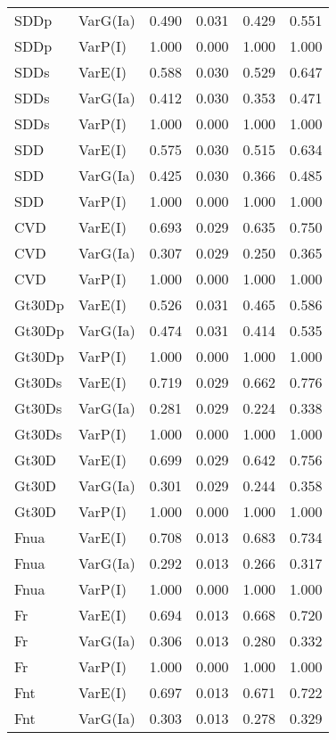\begin{center}
\begin{longtable}{|p{0.6in}|p{0.7in}|p{0.6in}|p{0.6in}|p{0.6in}|p{0.6in}|}
  SDDp & VarG(Ia) & 0.490 & 0.031 & 0.429 & 0.551 \\ 
  SDDp & VarP(I) & 1.000 & 0.000 & 1.000 & 1.000 \\ 
  SDDs & VarE(I) & 0.588 & 0.030 & 0.529 & 0.647 \\ 
  SDDs & VarG(Ia) & 0.412 & 0.030 & 0.353 & 0.471 \\ 
  SDDs & VarP(I) & 1.000 & 0.000 & 1.000 & 1.000 \\ 
  SDD & VarE(I) & 0.575 & 0.030 & 0.515 & 0.634 \\ 
  SDD & VarG(Ia) & 0.425 & 0.030 & 0.366 & 0.485 \\ 
  SDD & VarP(I) & 1.000 & 0.000 & 1.000 & 1.000 \\ 
  CVD & VarE(I) & 0.693 & 0.029 & 0.635 & 0.750 \\ 
  CVD & VarG(Ia) & 0.307 & 0.029 & 0.250 & 0.365 \\ 
  CVD & VarP(I) & 1.000 & 0.000 & 1.000 & 1.000 \\ 
  Gt30Dp & VarE(I) & 0.526 & 0.031 & 0.465 & 0.586 \\ 
  Gt30Dp & VarG(Ia) & 0.474 & 0.031 & 0.414 & 0.535 \\ 
  Gt30Dp & VarP(I) & 1.000 & 0.000 & 1.000 & 1.000 \\ 
  Gt30Ds & VarE(I) & 0.719 & 0.029 & 0.662 & 0.776 \\ 
  Gt30Ds & VarG(Ia) & 0.281 & 0.029 & 0.224 & 0.338 \\ 
  Gt30Ds & VarP(I) & 1.000 & 0.000 & 1.000 & 1.000 \\ 
  Gt30D & VarE(I) & 0.699 & 0.029 & 0.642 & 0.756 \\ 
  Gt30D & VarG(Ia) & 0.301 & 0.029 & 0.244 & 0.358 \\ 
  Gt30D & VarP(I) & 1.000 & 0.000 & 1.000 & 1.000 \\ 
  Fnua & VarE(I) & 0.708 & 0.013 & 0.683 & 0.734 \\ 
  Fnua & VarG(Ia) & 0.292 & 0.013 & 0.266 & 0.317 \\ 
  Fnua & VarP(I) & 1.000 & 0.000 & 1.000 & 1.000 \\ 
  Fr & VarE(I) & 0.694 & 0.013 & 0.668 & 0.720 \\ 
  Fr & VarG(Ia) & 0.306 & 0.013 & 0.280 & 0.332 \\ 
  Fr & VarP(I) & 1.000 & 0.000 & 1.000 & 1.000 \\ 
  Fnt & VarE(I) & 0.697 & 0.013 & 0.671 & 0.722 \\ 
  Fnt & VarG(Ia) & 0.303 & 0.013 & 0.278 & 0.329 \\ 

\end{longtable}
\end{center}
